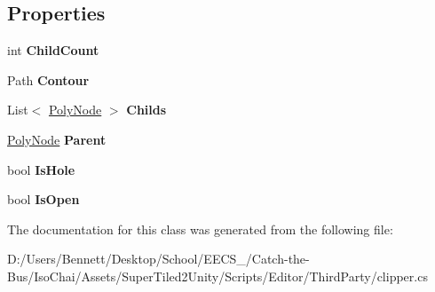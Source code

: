 \subsection*{Properties}
\begin{DoxyCompactItemize}
\item 
\mbox{\label{class_super_tiled2_unity_1_1_editor_1_1_clipper_lib_1_1_poly_node_a7bd6cee5f5c2a416d7f49b47cf6043d1}} 
int {\bfseries Child\+Count}
\item 
\mbox{\label{class_super_tiled2_unity_1_1_editor_1_1_clipper_lib_1_1_poly_node_aa0fbf0e19f3a550062568337b0d7dcb8}} 
Path {\bfseries Contour}
\item 
\mbox{\label{class_super_tiled2_unity_1_1_editor_1_1_clipper_lib_1_1_poly_node_a9bfc8a6dd89641330535d044a35b205a}} 
List$<$ \mbox{\hyperlink{class_super_tiled2_unity_1_1_editor_1_1_clipper_lib_1_1_poly_node}{Poly\+Node}} $>$ {\bfseries Childs}
\item 
\mbox{\label{class_super_tiled2_unity_1_1_editor_1_1_clipper_lib_1_1_poly_node_af66411a8f67bdc2fbd968179eef181c2}} 
\mbox{\hyperlink{class_super_tiled2_unity_1_1_editor_1_1_clipper_lib_1_1_poly_node}{Poly\+Node}} {\bfseries Parent}
\item 
\mbox{\label{class_super_tiled2_unity_1_1_editor_1_1_clipper_lib_1_1_poly_node_ab63cfbd06baa43835b34ba40d4a8e020}} 
bool {\bfseries Is\+Hole}
\item 
\mbox{\label{class_super_tiled2_unity_1_1_editor_1_1_clipper_lib_1_1_poly_node_a288ff33e9c76143a99dbb68ead861539}} 
bool {\bfseries Is\+Open}
\end{DoxyCompactItemize}


The documentation for this class was generated from the following file\+:\begin{DoxyCompactItemize}
\item 
D\+:/\+Users/\+Bennett/\+Desktop/\+School/\+E\+E\+C\+S\+\_/\+Catch-\/the-\/\+Bus/\+Iso\+Chai/\+Assets/\+Super\+Tiled2\+Unity/\+Scripts/\+Editor/\+Third\+Party/clipper.\+cs\end{DoxyCompactItemize}
